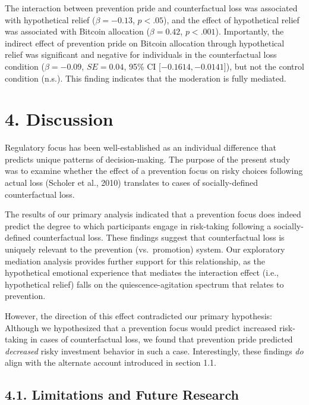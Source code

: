 \documentclass[man,floatsintext]{apa6}
\begin{document}
The interaction between prevention pride and counterfactual loss was associated with hypothetical relief (\(\beta = -0.13\), \(p < .05\)), and the effect of hypothetical relief was associated with Bitcoin allocation (\(\beta = 0.42\), \(p < .001\)). Importantly, the indirect effect of prevention pride on Bitcoin allocation through hypothetical relief was significant and negative for individuals in the counterfactual loss condition (\(\beta = -0.09\), \(SE = 0.04\), 95\% CI {[}\(-0.1614, -0.0141\){]}), but not the control condition (n.s.). This finding indicates that the moderation is fully mediated.

\hypertarget{discussion}{%
\section{4. Discussion}\label{discussion}}

Regulatory focus has been well-established as an individual difference that predicts unique patterns of decision-making. The purpose of the present study was to examine whether the effect of a prevention focus on risky choices following actual loss (Scholer et al., 2010) translates to cases of socially-defined counterfactual loss.

The results of our primary analysis indicated that a prevention focus does indeed predict the degree to which participants engage in risk-taking following a socially-defined counterfactual loss. These findings suggest that counterfactual loss is uniquely relevant to the prevention (vs.~promotion) system. Our exploratory mediation analysis provides further support for this relationship, as the hypothetical emotional experience that mediates the interaction effect (i.e., hypothetical relief) falls on the quiescence-agitation spectrum that relates to prevention.

However, the direction of this effect contradicted our primary hypothesis: Although we hypothesized that a prevention focus would predict increased risk-taking in cases of counterfactual loss, we found that prevention pride predicted \emph{decreased} risky investment behavior in such a case. Interestingly, these findings \emph{do} align with the alternate account introduced in section 1.1.

\hypertarget{limitations-and-future-research}{%
\subsection{4.1. Limitations and Future Research}\label{limitations-and-future-research}}
\end{document}
